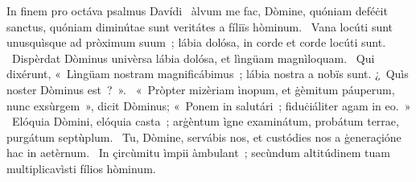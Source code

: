 { In finem pro octáva psalmus Davídi}
{%
~àlvum me fac, Dòmine, quóniam deféċit sanctus, quóniam diminútae sunt veritátes a fíliïs hòminum.
~Vana locúti sunt unusquìsque ad pròximum suum~; lábia dolósa, in corde et corde locúti sunt.
~Dispèrdat Dòminus univèrsa lábia dolósa, et lìngüam magnìloquam.
~Qui dixérunt, «~Lìngüam nostram magnificábimus~; lábia nostra a nobïs sunt. ¿~Quìs noster Dòminus est~?~».
~«~Pròpter mizèriam ìnopum, et ġèmitum páuperum, nunc exsùrgem~», dicit Dòminus; «~Ponem in salutári~; fiduċiáliter agam in eo.~»
~Elóquia Dòmini, elóquia casta~; arġèntum ìgne examinátum, probátum terrae, purgátum septùplum.
~Tu, Dòmine, servábis nos, et custódies nos a ġeneraçióne hac in aetèrnum.
~In çircùmitu ìmpii àmbulant~; secùndum altitúdinem tuam multiplicavìsti fílios hòminum.
}
